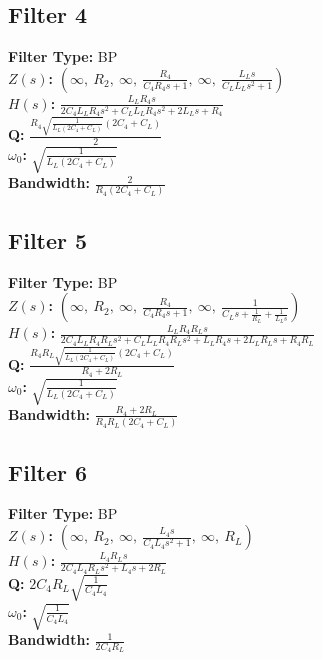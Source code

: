 \documentclass{article}
\begin{document}
\subsection*{Filter 4}
\textbf{Filter Type:} BP \\ 
\textbf{$Z(s)$:} $\left( \infty, \  R_{2}, \  \infty, \  \frac{R_{4}}{C_{4} R_{4} s + 1}, \  \infty, \  \frac{L_{L} s}{C_{L} L_{L} s^{2} + 1}\right)$ \\ 
\textbf{$H(s)$:} $\frac{L_{L} R_{4} s}{2 C_{4} L_{L} R_{4} s^{2} + C_{L} L_{L} R_{4} s^{2} + 2 L_{L} s + R_{4}}$ \\ 
\textbf{Q:} $\frac{R_{4} \sqrt{\frac{1}{L_{L} \left(2 C_{4} + C_{L}\right)}} \left(2 C_{4} + C_{L}\right)}{2}$ \\ 
\textbf{$\omega_0$:} $\sqrt{\frac{1}{L_{L} \left(2 C_{4} + C_{L}\right)}}$ \\ 
\textbf{Bandwidth:} $\frac{2}{R_{4} \left(2 C_{4} + C_{L}\right)}$ \\ 
\subsection*{Filter 5}
\textbf{Filter Type:} BP \\ 
\textbf{$Z(s)$:} $\left( \infty, \  R_{2}, \  \infty, \  \frac{R_{4}}{C_{4} R_{4} s + 1}, \  \infty, \  \frac{1}{C_{L} s + \frac{1}{R_{L}} + \frac{1}{L_{L} s}}\right)$ \\ 
\textbf{$H(s)$:} $\frac{L_{L} R_{4} R_{L} s}{2 C_{4} L_{L} R_{4} R_{L} s^{2} + C_{L} L_{L} R_{4} R_{L} s^{2} + L_{L} R_{4} s + 2 L_{L} R_{L} s + R_{4} R_{L}}$ \\ 
\textbf{Q:} $\frac{R_{4} R_{L} \sqrt{\frac{1}{L_{L} \left(2 C_{4} + C_{L}\right)}} \left(2 C_{4} + C_{L}\right)}{R_{4} + 2 R_{L}}$ \\ 
\textbf{$\omega_0$:} $\sqrt{\frac{1}{L_{L} \left(2 C_{4} + C_{L}\right)}}$ \\ 
\textbf{Bandwidth:} $\frac{R_{4} + 2 R_{L}}{R_{4} R_{L} \left(2 C_{4} + C_{L}\right)}$ \\ 
\subsection*{Filter 6}
\textbf{Filter Type:} BP \\ 
\textbf{$Z(s)$:} $\left( \infty, \  R_{2}, \  \infty, \  \frac{L_{4} s}{C_{4} L_{4} s^{2} + 1}, \  \infty, \  R_{L}\right)$ \\ 
\textbf{$H(s)$:} $\frac{L_{4} R_{L} s}{2 C_{4} L_{4} R_{L} s^{2} + L_{4} s + 2 R_{L}}$ \\ 
\textbf{Q:} $2 C_{4} R_{L} \sqrt{\frac{1}{C_{4} L_{4}}}$ \\ 
\textbf{$\omega_0$:} $\sqrt{\frac{1}{C_{4} L_{4}}}$ \\ 
\textbf{Bandwidth:} $\frac{1}{2 C_{4} R_{L}}$ \\ 
\end{document}

